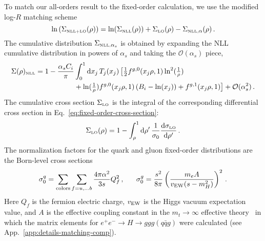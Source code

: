 \documentclass[letterpaper,11pt]{article}
\newcommand{\App}[1]{App.~\ref{#1}}
\newcommand{\Eq}[1]{Eq.~\eqref{#1}}
\begin{document}
To match our all-orders result to the fixed-order calculation, we use the modified log-$R$ matching scheme \cite{Catani:1992ua}
\begin{equation}
\label{eq:matching-logR}
\ln\left(\Sigma_{\mbox{\tiny NLL+LO}}(\rho)\right) = \ln(\Sigma_{\mbox{\tiny NLL}}(\rho)) + \Sigma_{\mbox{\tiny LO}}(\rho) - \Sigma_{\mbox{\tiny NLL,}\alpha}(\rho)  \,.
\end{equation}
The cumulative distribution $\Sigma_{\mbox{\tiny NLL,}\alpha_s}$ is obtained by expanding the NLL cumulative distribution in powers of $\alpha_s$ and taking the $\mathcal{O}(\alpha_s)$ piece,
\begin{align}
\label{eq:cumulative-NLL-alpha-approx}
\Sigma(\rho)_{\mbox{\tiny NLL}} = 1 - \frac{\alpha_sC_i}{\pi}&\int_0^1\text{d}x_j\,T_j(x_j)\, \big[\tfrac{1}{2}f^{g,0}(x_j\rho,1)\ln^2(\tfrac{1}{\rho})\\ \nonumber
& + \ln(\tfrac{1}{\rho})f^{g,0}(x_j\rho,1)\left(B_i-\ln(x_j)\right) + f^{g,1}(x_j\rho,1)\big] + \mathcal{O}(\alpha_s^2)\,.
\end{align}
The cumulative cross section $\Sigma_{\mbox{\tiny LO}}$ is the integral of the corresponding differential cross section in \Eq{eq:fixed-order-cross-section}:
\begin{equation}
\Sigma_{\mbox{\tiny LO}}(\rho) = 1 - \int_\rho^1 \text{d}\rho'\, \frac{1}{\sigma_0}\frac{\text{d}\sigma_{\mbox{\tiny LO}}}{\text{d}\rho'} \,.
\end{equation}
The normalization factors for the quark and gluon fixed-order distributions are the Born-level cross sections
\begin{equation}
\sigma_0^q = \sum_{\rm colors}\sum_{f = u,\ldots b} \frac{4\pi \alpha^2}{3s}Q_f^2\,, \ \ \ \ \ \sigma_0^g = \frac{s^2}{8\pi} \left(\frac{m_eA}{v_{\rm EW}(s - m_H^2)}\right)^2 \,.
\end{equation}
Here $Q_f$ is the fermion electric charge, $v_{\rm EW}$ is the Higgs vacuum expectation value, and $A$ is the effective coupling constant in the $m_t \rightarrow \infty$ effective theory~\cite{Inami:1982xt,Dawson:1990zj,Spira:1995rr} in which the matrix elements for $e^+e^-\rightarrow H \rightarrow ggg (q\bar{q}g)$ were calculated (see \App{app:details-matching-comp}). 
\end{document}
